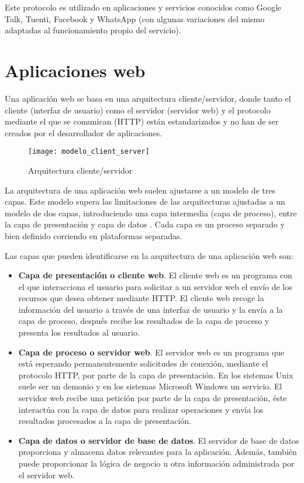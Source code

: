 Este protocolo es utilizado en aplicaciones y servicios conocidos como Google Talk, Tuenti, Facebook y WhatsApp (con algunas variaciones del mismo adaptadas al funcionamiento propio del servicio).

\section{Aplicaciones web}

Una aplicación web se basa en una arquitectura cliente/servidor, donde tanto el cliente (interfaz de usuario) como el servidor (servidor web) y el protocolo mediante el que se comunican (HTTP) están estandarizados y no han de ser creados por el desarrollador de aplicaciones.

\begin{figure}[htp!]
  \centering
  \texttt{[image: modelo\_client\_server]}
  \caption{Arquitectura cliente/servidor}
  \label{fig:modelo_client_server}
\end{figure}

La arquitectura de una aplicación web suelen ajustarse a un modelo de tres capas. Este modelo supera las limitaciones de las arquitecturas ajustadas a un modelo de dos capas, introduciendo una capa intermedia (capa de proceso), entre la capa de presentación y  capa de datos \cite{web1}. Cada capa es un proceso separado y bien definido corriendo en plataformas separadas.

Las capas que pueden identificarse en la arquitectura de una aplicación web son:

\begin{itemize}
  \item \textbf{Capa de presentación o cliente web}. El cliente web es un programa con el que interacciona el usuario para solicitar a un servidor web el envío de los recursos que desea obtener mediante HTTP. El cliente web recoge la información del usuario a través de una interfaz de usuario y la envía a la capa de proceso, después recibe los resultados de la capa de proceso y presenta los resultados al usuario.
  \item \textbf{Capa de proceso o servidor web}. El servidor web es un programa que está esperando permanentemente solicitudes de conexión, mediante el protocolo HTTP, por parte de la capa de presentación. En los sistemas Unix suele ser un demonio y en los sistemas Microsoft Windows un servicio. El servidor web recibe una petición por parte de la capa de presentación, éste interactúa con la capa de datos para realizar operaciones y envía los resultados procesados a la capa de presentación.
  \item \textbf{Capa de datos o servidor de base de datos}. El servidor de base de datos proporciona y almacena datos relevantes para la aplicación. Además, también puede proporcionar la lógica de negocio u otra información administrada por el servidor web.
\end{itemize}

